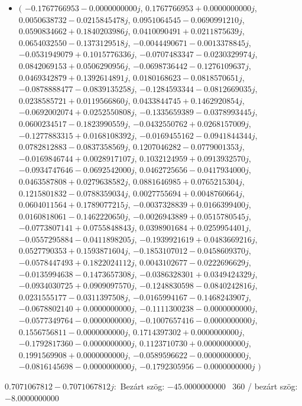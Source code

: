 \documentclass[14pt,a4paper]{article}
\begin{document}
\begin{itemize}
\item
$\big($
$-0.1767766953-0.0000000000j$, $0.1767766953+0.0000000000j$, $0.0050638732-0.0215845478j$, $0.0951064545-0.0690991210j$, $0.0590834662+0.1840203986j$, $0.0410090491+0.0211875639j$, $0.0654032550-0.1373129518j$, $-0.0044490671-0.0013378845j$, $-0.0531949079+0.1015776336j$, $-0.0707483347-0.0230329974j$, $0.0842069153+0.0506290956j$, $-0.0698736442-0.1276109637j$, $0.0469342879+0.1392614891j$, $0.0180168623-0.0818570651j$, $-0.0878888477-0.0839135258j$, $-0.1284593344-0.0812669035j$, $0.0238585721+0.0119566860j$, $0.0433844745+0.1462920854j$, $-0.0692002074+0.0252550808j$, $-0.1335659389-0.0378993445j$, $0.0600234517-0.1823990559j$, $-0.0432550762+0.0268157009j$, $-0.1277883315+0.0168108392j$, $-0.0169455162-0.0941844344j$, $0.0782812883-0.0837358569j$, $0.1207046282-0.0779001353j$, $-0.0169846744+0.0028917107j$, $0.1032124959+0.0913932570j$, $-0.0934747646-0.0692542000j$, $0.0462725656-0.0417934000j$, $0.0463587808+0.0279638582j$, $0.0881646985+0.0765215304j$, $0.1215801832-0.0788359034j$, $0.0027755694+0.0048760664j$, $0.0604011564+0.1789077215j$, $-0.0037328839+0.0166399400j$, $0.0160818061-0.1462220650j$, $-0.0026943889+0.0515780545j$, $-0.0773807141+0.0755848843j$, $0.0398901684+0.0259954401j$, $-0.0557295884-0.0411898205j$, $-0.1939921619+0.0483669216j$, $0.0527790353+0.1593871604j$, $-0.1853107012-0.0458609370j$, $-0.0578447493+0.1822024112j$, $0.0043102677-0.0222696629j$, $-0.0135994638-0.1473657308j$, $-0.0386328301+0.0349424329j$, $-0.0934030725+0.0909097570j$, $-0.1248830598-0.0840242816j$, $0.0231555177-0.0311397508j$, $-0.0165994167-0.1468243907j$, $-0.0678802140+0.0000000000j$, $-0.1111300238-0.0000000000j$, $-0.0577349764-0.0000000000j$, $-0.1007657416-0.0000000000j$, $0.1556756811-0.0000000000j$, $0.1714397302+0.0000000000j$, $-0.1792817360-0.0000000000j$, $0.1123710730+0.0000000000j$, $0.1991569908+0.0000000000j$, $-0.0589596622-0.0000000000j$, $-0.0816145698-0.0000000000j$, $-0.1792305956-0.0000000000j$
$\big)$
\end{itemize}
$0.7071067812-0.7071067812j$:\
Bezárt szög: $-45.0000000000$ \
360 / bezárt szög: $-8.0000000000$\
\end{document}
